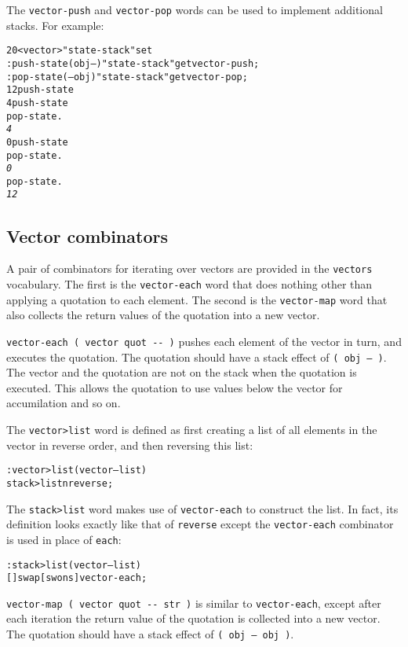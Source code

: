 \documentclass[english]{article}
\begin{document}
The \texttt{vector-push} and \texttt{vector-pop} words can be used to implement additional stacks. For example:

\begin{alltt}
20 <vector> "state-stack" set
: push-state ( obj -- ) "state-stack" get vector-push ;
: pop-state ( -- obj ) "state-stack" get vector-pop ;
12 push-state
4 push-state
pop-state .
\emph{4}
0 push-state
pop-state .
\emph{0}
pop-state .
\emph{12}
\end{alltt}

\subsection{Vector combinators}

A pair of combinators for iterating over vectors are provided in the \texttt{vectors} vocabulary. The first is the \texttt{vector-each} word that does nothing other than applying a quotation to each element. The second is the \texttt{vector-map} word that also collects the return values of the quotation into a new vector.

\texttt{vector-each ( vector quot -{}- )} pushes each element of the vector in turn, and executes the quotation. The quotation should have a stack effect of \texttt{( obj -- )}. The vector and the quotation are not on the stack when the quotation is executed. This allows the quotation to use values below the vector for accumilation and so on.

The \texttt{vector>list} word is defined as first creating a list of all elements in the vector in reverse order, and then reversing this list:

\begin{alltt}
: vector>list ( vector -- list )
    stack>list nreverse ;
\end{alltt}

The \texttt{stack>list} word makes use of \texttt{vector-each} to construct the list. In fact, its definition looks exactly like that of \texttt{reverse} except the \texttt{vector-each} combinator is used in place of \texttt{each}:

\begin{alltt}
: stack>list ( vector -- list )
    {[} {]} swap {[} swons {]} vector-each ;
\end{alltt}

\texttt{vector-map ( vector quot -{}- str )} is similar to \texttt{vector-each}, except after each iteration the return value of the quotation is collected into a new vector. The quotation should have a stack effect of \texttt{( obj -- obj )}.
\end{document}
